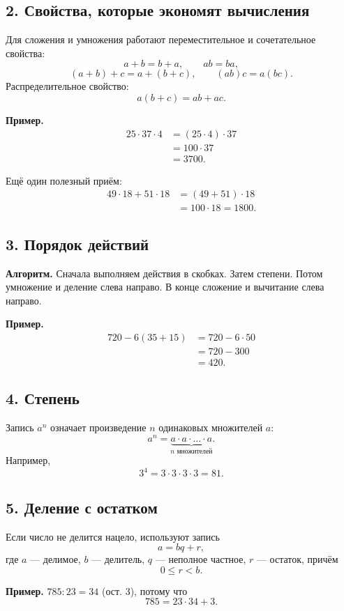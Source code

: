 \documentclass[12pt,a4paper]{article}
\newcommand{\algorithm}[1]{%
  \par\smallskip
  {\color{accent}\textbf{Алгоритм.}} #1\par\smallskip
}
\begin{document}
\subsection*{2. Свойства, которые экономят вычисления}
Для сложения и умножения работают переместительное и сочетательное свойства:
\[
a+b=b+a,\qquad ab=ba,
\]
\[
(a+b)+c=a+(b+c),\qquad (ab)c=a(bc).
\]
Распределительное свойство:
\[
a(b+c)=ab+ac.
\]

\textbf{Пример.}
\begin{align*}
25\cdot37\cdot4&=(25\cdot4)\cdot37\\
&=100\cdot37\\
&=3700.
\end{align*}

Ещё один полезный приём:
\begin{align*}
49\cdot18+51\cdot18&=(49+51)\cdot18\\
&=100\cdot18=1800.
\end{align*}

\subsection*{3. Порядок действий}
\algorithm{Сначала выполняем действия в скобках. Затем степени. Потом умножение и деление слева направо. В конце сложение и вычитание слева направо.}

\textbf{Пример.}
\begin{align*}
720-6(35+15)&=720-6\cdot50\\
&=720-300\\
&=420.
\end{align*}

\subsection*{4. Степень}
Запись $a^n$ означает произведение $n$ одинаковых множителей $a$:
\[
a^n=\underbrace{a\cdot a\cdot\ldots\cdot a}_{n\text{ множителей}}.
\]
Например,
\[
3^4=3\cdot3\cdot3\cdot3=81.
\]

\subsection*{5. Деление с остатком}
Если число не делится нацело, используют запись
\[
a=bq+r,
\]
где $a$ --- делимое, $b$ --- делитель, $q$ --- неполное частное, $r$ --- остаток, причём
\[
0\le r<b.
\]

\textbf{Пример.} $785:23=34$ (ост. $3$), потому что
\[
785=23\cdot34+3.
\]
\end{document}
